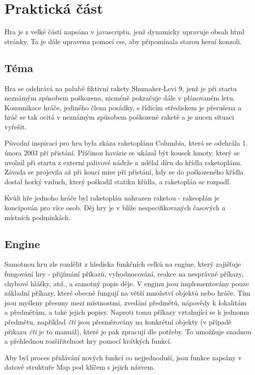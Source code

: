 \documentclass[main.tex]{subfiles}
\begin{document}
\section{Praktická část}
Hra je z velké části napsána v javascriptu, jenž dynamicky upravuje obsah html stránky. Ta je dále upravena pomocí css, aby připomínala starou herní konzoli. 

\subsection{Téma}
Hra se odehrává na palubě fiktivní rakety Shumaker-Levi 9, jenž je při startu neznámým způsobem poškozena, nicméně pokračuje dále v plánovaném letu. Komunikace hráče, jediného člena posádky, s řídicím střediskem je přerušena a hráč se tak ocitá v neznámým způsobem poškozené raketě a je nucen situaci vyřešit. 

Původní inspirací pro hru byla zkáza raketoplánu Columbia, která se odehrála 1. února 2003 při přistání. Příčinou havárie se ukázal být kousek hmoty, který se uvolnil při startu z externí palivové nádrže a udělal díru do křídla raketoplánu. Závada se projevila až při konci mise při přistání, kdy se do poškozeného křídla dostal horký vzduch, který poškodil statiku křídla, a raketoplán se rozpadl. \cite{web:wik:cz:columbia} 

Kvůli hře jednoho hráče byl raketoplán nahrazen raketou - rakeoplán je koncipován pro více osob. Děj hry je v blíže nespecifikovaných časových a místních podmínkách.

\subsection{Engine}
Samotnou hru zle rozdělit z hlediska funkčních celků na engine, který zajišťuje fungování hry - přijímání příkazů, vyhodnocování, reakce na nesprávné příkazy, chybové hlášky, atd., a samotný popis děje.
V enginu jsou implementovány pouze základní příkazy, které obecně fungují na větší množství objektů nebo hráče. Tím jsou myšleny přesuny mezi místnostmi, zvedání předmětů, nápovědy k lokalitám a předmětům, a také jejich popisy. Naproti tomu příkazy vztahující se k jednomu předmětu, například \textit{čti} jsou přesměrovány na konkrétní objekty (v případě přikazu \textit{čti} je to manuál), které je pak zpracují dle potřeby. To umožňuje snadnou a přehlednou rozšiřitelnost hry pomocí krátkých funkcí.

Aby byl proces přidávání nových funkcí co nejjednoduší, jsou funkce zapsány v datové struktuře Map pod klíčem s jejich názvem. 
\end{document}
